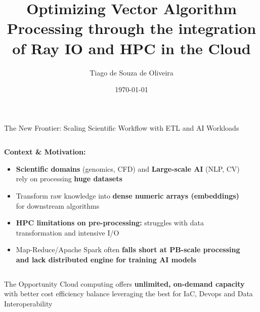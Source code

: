 \documentclass[aspectratio=169]{beamer}
\title[Optimizing Vector Algorithm Processing]{Optimizing Vector Algorithm Processing through the integration of Ray IO and HPC in the Cloud}
\author{Tiago de Souza de Oliveira}
\institute[University]{
    Master's Thesis Defense \\
    Computer Science Department
}
\date{\today}
\begin{document}
\frame{\titlepage}

\begin{frame}{The New Frontier: Scaling Scientific Workflow with ETL and AI Workloads}
    \begin{columns}
        \begin{column}{0.6\textwidth}
            \textbf{Context \& Motivation:}
            \begin{itemize}
                \item \textbf{Scientific domains} (genomics, CFD) and \textbf{Large-scale AI} (NLP, CV) rely on processing \textbf{huge datasets}
                \item Transform raw knowledge into \textcolor{rayblue}{\textbf{dense numeric arrays (embeddings)}} for downstream algorithms
                \item \textbf{HPC limitations on pre-processing:} struggles with data transformation and intensive I/O
                \item Map-Reduce/Apache Spark often \textbf{falls short at PB-scale processing and lack distributed engine for training AI models}
            \end{itemize}
        \end{column}
        \begin{column}{0.4\textwidth}
        \end{column}
    \end{columns}
    
    \vspace{0.3cm}
    \begin{block}{The Opportunity}
        Cloud computing offers \textbf{unlimited, on-demand capacity} with better cost efficiency balance leveraging the best for IaC, Devops and Data Interoperability
    \end{block}
\end{frame}
\end{document}
